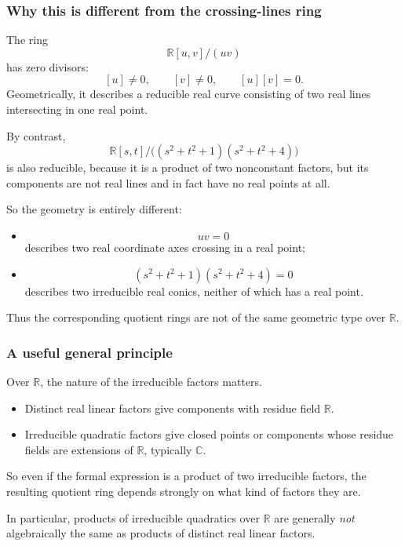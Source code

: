 \documentclass[12pt,a4paper]{article}
\theoremstyle{notespace}
\theoremstyle{definition}
\begin{document}
\subsubsection{Why this is different from the crossing-lines ring}

The ring
\[
\mathbb{R}[u,v]/(uv)
\]
has zero divisors:
\[
[u]\neq 0,\qquad [v]\neq 0,\qquad [u][v]=0.
\]
Geometrically, it describes a reducible real curve consisting of two real lines intersecting in one real point.

By contrast,
\[
\mathbb{R}[s,t]\Big/\bigl((s^2+t^2+1)(s^2+t^2+4)\bigr)
\]
is also reducible, because it is a product of two nonconstant factors, but its components are not real lines and in fact have no real points at all.

So the geometry is entirely different:

\begin{itemize}
	\item
	\[
	uv=0
	\]
	describes two real coordinate axes crossing in a real point;
	
	\item
	\[
	(s^2+t^2+1)(s^2+t^2+4)=0
	\]
	describes two irreducible real conics, neither of which has a real point.
\end{itemize}

Thus the corresponding quotient rings are not of the same geometric type over \(\mathbb{R}\).

\subsubsection{A useful general principle}

Over \(\mathbb{R}\), the nature of the irreducible factors matters.

\begin{itemize}
	\item Distinct real linear factors give components with residue field \(\mathbb{R}\).
	\item Irreducible quadratic factors give closed points or components whose residue fields are extensions of \(\mathbb{R}\), typically \(\mathbb{C}\).
\end{itemize}

So even if the formal expression is a product of two irreducible factors, the resulting quotient ring depends strongly on what kind of factors they are.

In particular, products of irreducible quadratics over \(\mathbb{R}\) are generally \emph{not} algebraically the same as products of distinct real linear factors.
\end{document}
